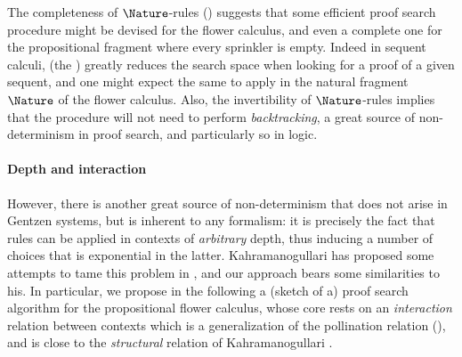 The completeness of $\Nature$-rules () suggests
that some efficient proof search procedure might be devised for the flower
calculus, and even a complete one for the propositional fragment where every
sprinkler is empty. Indeed in sequent calculi, 
(the ) greatly reduces the search space when looking for a
proof of a given sequent, and one might expect the same to apply in the natural
fragment $\Nature$ of the flower calculus. Also, the invertibility of
$\Nature$-rules implies that the procedure will not need to perform
\emph{backtracking}, a great source of non-determinism in proof
search, and particularly so in  logic.

\paragraph{Depth and interaction}

However, there is another great source of non-determinism that does not arise in
Gentzen systems, but is inherent to any  formalism: it is
precisely the fact that rules can be applied in contexts of \emph{arbitrary}
depth, thus inducing a number of choices that is exponential in the latter.
Kahramanogullari has proposed some attempts to tame this problem in
, and our approach bears some
similarities to his. In particular, we propose in the following a (sketch of a)
proof search algorithm for the propositional flower calculus, whose core rests
on an \emph{interaction} relation between contexts which is a generalization of
the pollination relation (), and is close to the
\emph{structural} relation of Kahramanogullari
\cite[Definition~2.13]{lmcs:1089}.

